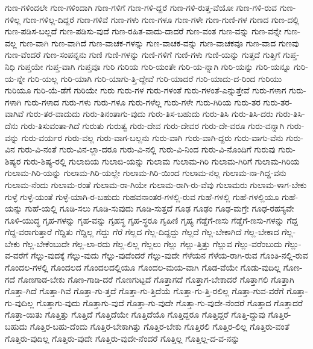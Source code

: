 {ಗುಣ-ಗಳಿಂದಲೇ
ಗುಣ-ಗಳಿಂದಾಗಿ
ಗುಣ-ಗಳಿಗೆ
ಗುಣ-ಗಳಿ-ದ್ದರೆ
ಗುಣ-ಗಳಿ-ರುತ್ತ-ವೆಯೋ
ಗುಣ-ಗಳಿ-ರುವ
ಗುಣ-ಗಳಿಲ್ಲ
ಗುಣ-ಗಳಿಲ್ಲ-ದಿದ್ದರೆ
ಗುಣ-ಗಳಿವೆ
ಗುಣ-ಗಳು
ಗುಣ-ಗಳೂ
ಗುಣ-ಗಳೇ
ಗುಣ-ಗುಣಿ-ಗಳ
ಗುಣದ
ಗುಣ-ದಲ್ಲಿ
ಗುಣ-ಪಡಿಸ-ಬಲ್ಲದೆ
ಗುಣ-ಪಡಿಸು-ವುದೆ
ಗುಣ-ರಹಿತ-ವಾದು-ದಾದರೆ
ಗುಣ-ವಂತ
ಗುಣ-ವನ್ನು
ಗುಣ-ವನ್ನೇ
ಗುಣ-ವಲ್ಲ
ಗುಣ-ವಾಗಿ
ಗುಣ-ವಾಗಿದೆ
ಗುಣ-ವಾಚಕ-ಗಳನ್ನು
ಗುಣ-ವಾಚಕ-ವನ್ನು
ಗುಣ-ವಾಚಕವೂ
ಗುಣ-ವಾದ
ಗುಣವು
ಗುಣ-ವೆಂದರೆ
ಗುಣ-ಸಂಪನ್ನನು
ಗುಣಿ
ಗುಣಿ-ಗಳನ್ನು
ಗುಣಿ-ಗಳಿಗೆ
ಗುಣಿ-ಗಳು
ಗುಣಿ-ಯನ್ನು
ಗುತ್ತದೆ
ಗುತ್ತಿಗೆ
ಗುಪ್ತ-ನಿಧಿ
ಗುಪ್ತಯೇ
ಗುಪ್ತ-ವಾಗಿ
ಗುಪ್ತವೂ
ಗುರಿ
ಗುರಿಯ
ಗುರಿ-ಯಂತೇ
ಗುರಿ-ಯ-ನ್ನಾಗಿ
ಗುರಿ-ಯನ್ನು
ಗುರಿ-ಯನ್ನೂ
ಗುರಿ-ಯ-ನ್ನೇ
ಗುರಿ-ಯಲ್ಲ
ಗುರಿ-ಯಾಗಿ
ಗುರಿ-ಯಾಗು-ತ್ತಿ-ದ್ದೇವೆ
ಗುರಿ-ಯಾದರೆ
ಗುರಿ-ಯಾದು-ದ-ರಿಂದ
ಗುರಿಯು
ಗುರಿಯೂ
ಗುರಿ-ಯೆ-ಡೆಗೆ
ಗುರಿಯೇ
ಗುರು
ಗುರು-ಗಳ
ಗುರು-ಗಳಂತೆ
ಗುರು-ಗಳಂತೆ-ಎನ್ನುತ್ತೇವೆ
ಗುರು-ಗಳಾಗ
ಗುರು-ಗಳಾಗಿ
ಗುರು-ಗಳಾದ
ಗುರು-ಗಳು
ಗುರು-ಗಳೂ
ಗುರು-ಗಳೆಲ್ಲ
ಗುರು-ಗಳೇ
ಗುರು-ಗಿರಿಯ
ಗುರು-ತರ
ಗುರು-ತರ-ವಾಗಿವೆ
ಗುರು-ತರ-ವಾದುದು
ಗುರು-ತಿನಂತಾಗು-ವುದು
ಗುರು-ತಿಸ-ಬಹುದು
ಗುರು-ತಿಸಿ
ಗುರು-ತಿಸಿ-ದರು
ಗುರು-ತಿಸಿ-ದೆನು
ಗುರು-ತಿಸುವಂತಾ-ಗಿದೆ
ಗುರುತು
ಗುರುತ್ವ
ಗುರು-ದೇವ
ಗುರು-ದೇವರ
ಗುರು-ದೇ-ವರೂ
ಗುರು-ವನ್ನಾಗಿ
ಗುರು-ವನ್ನು
ಗುರು-ವರ್ಯರ
ಗುರು-ವಲ್ಲ
ಗುರು-ವಾಗ-ಬಲ್ಲನು
ಗುರು-ವಾಗಿ
ಗುರು-ವಾಗಿ-ದ್ದರು
ಗುರು-ವಾಗು-ವೆನು
ಗುರು-ವಿನ
ಗುರು-ವಿ-ನಂತೆ
ಗುರು-ವಿನ-ಲ್ಲಾ-ದರೂ
ಗುರು-ವಿ-ನಲ್ಲಿ
ಗುರು-ವಿ-ನಿಂದ
ಗುರು-ವಿ-ನೊಂದಿಗೆ
ಗುರುವು
ಗುರು-ಶಿಷ್ಯರ
ಗುರು-ಶಿಷ್ಯ-ರಲ್ಲಿ
ಗುಲಾಬಿಯ
ಗುಲಾಬಿ-ಯನ್ನು
ಗುಲಾಮ
ಗುಲಾಮ-ಗಿರಿ
ಗುಲಾಮ-ಗಿರಿಗೆ
ಗುಲಾಮ-ಗಿರಿಯ
ಗುಲಾಮ-ಗಿರಿ-ಯನ್ನು
ಗುಲಾಮ-ಗಿರಿ-ಯಲ್ಲೇ
ಗುಲಾಮ-ಗಿರಿ-ಯಿಂದ
ಗುಲಾಮ-ನಲ್ಲ
ಗುಲಾಮ-ನಾ-ಗಿದ್ದ-ವನು
ಗುಲಾಮ-ನೆಂದು
ಗುಲಾಮ-ರಂತೆ 
ಗುಲಾಮ-ರಾ-ಗಿಯೇ
ಗುಲಾಮ-ರಾಗಿ-ರು-ವೆವು
ಗುಲಾಮರು
ಗುಲಾಮ-ಳಾಗ-ಬೇಕು
ಗುಳ್ಳೆ
ಗುಳ್ಳೆ-ಯಂತೆ
ಗುಳ್ಳೆ-ಯಾಗಿ-ರ-ಬಹುದು
ಗುಹವನಾಂತರ-ಗಳಲ್ಲಿ-ರುವ
ಗುಹೆ-ಗಳಲ್ಲಿ
ಗುಹೆ-ಗಳಲ್ಲಿಯೂ
ಗುಹೆ-ಯನ್ನು
ಗುಹೆ-ಯಲ್ಲಿ
ಗೂಡಿ-ಸಲು
ಗೂಡಿ-ಸುವುದು
ಗೂಡಿ-ಸುತ್ತದೆ
ಗೂಢ
ಗೂಢಂ
ಗೂಢ-ಮಗ್ರೇ
ಗೂಢ-ರಹಸ್ಯವೇ
ಗೂಳಿ-ಯುದ್ಧ
ಗೃಹ-ಗಳನ್ನು
ಗೃಹ-ವನ್ನು
ಗೃಹಸ್ಥ
ಗೃಹ-ಸ್ಥರೂ
ಗೃಹಿಣಿ
ಗೃಹ್ಯ
ಗೆಡ್ಡೆಗೆ-ಣಸು
ಗೆಡ್ಡೆಗೆ-ಣಸು-ಗಳನ್ನು
ಗೆದ್ದ
ಗೆದ್ದ-ವರಾಗುತ್ತಾರೆ
ಗೆದ್ದಿತು
ಗೆದ್ದಿಲ್ಲ
ಗೆದ್ದು
ಗೆರೆ
ಗೆಲ್ಲದ
ಗೆಲ್ಲ-ದಿದ್ದದ್ದು
ಗೆಲ್ಲದೆ
ಗೆಲ್ಲ-ಬೇಕಾಗಿದೆ
ಗೆಲ್ಲ-ಬೇಕಾದ
ಗೆಲ್ಲ-ಬೇಕು
ಗೆಲ್ಲ-ಬೇಕೆಂಬುದೇ
ಗೆಲ್ಲ-ಲಾ-ರದು
ಗೆಲ್ಲ-ಲಿಲ್ಲ
ಗೆಲ್ಲಲು
ಗೆಲ್ಲು
ಗೆಲ್ಲು-ತ್ತಿತ್ತು
ಗೆಲ್ಲುವ
ಗೆಲ್ಲು-ವರೆಂಬುದು
ಗೆಲ್ಲು-ವ-ವರೆಗೆ
ಗೆಲ್ಲು-ವುದಕ್ಕೆ
ಗೆಲ್ಲು-ವುದು
ಗೆಲ್ಲು-ವುದೆಂದರೆ
ಗೆಲ್ಲು-ವುದೇ
ಗೆಳೆಯನ
ಗೆಳೆಯ-ರಾಗಿ-ರುವ
ಗೊಂತಿ-ನಲ್ಲಿ-ರುವ
ಗೊಂದಲ-ಗಳಲ್ಲಿ
ಗೊಂದಲದ
ಗೊಂದಲದಲ್ಲಿಯೂ
ಗೊಂದಲ-ಮಯ-ವಾಗಿ
ಗೊಡ-ವೆಯೇ
ಗೊಡು-ವುದಿಲ್ಲ
ಗೊಣ-ಗದೆ
ಗೊಣಗಾಡ-ಬೇಕು
ಗೊಣ-ಗಾಡಿ-ದರೆ
ಗೊಣಗುಟ್ಟದೆ
ಗೊತ್ತಾಗದೆ
ಗೊತ್ತಾಗ-ಬೇಕಾದರೆ
ಗೊತ್ತಾಗಲಿ
ಗೊತ್ತಾಗಿ
ಗೊತ್ತಾ-ಗಿದೆ
ಗೊತ್ತಾ-ಗಿವೆ
ಗೊತ್ತಾ-ಗು-ತ್ತದೆ
ಗೊತ್ತಾ-ಗು-ತ್ತಿದೆಯೆ
ಗೊತ್ತಾ-ಗು-ತ್ತಿ-ರಲಿಲ್ಲ
ಗೊತ್ತಾ-ಗುವ-ವರೆಗೆ
ಗೊತ್ತಾ-ಗು-ವುದಿಲ್ಲ
ಗೊತ್ತಾಗು-ವುದು
ಗೊತ್ತಾಗು-ವುದೆ
ಗೊತ್ತಾ-ಗು-ವುದೇ
ಗೊತ್ತಾ-ಗು-ವುದೇ-ನೆಂದರೆ
ಗೊತ್ತಾದ
ಗೊತ್ತಾದರೆ
ಗೊತ್ತಾ-ಯಿತು
ಗೊತ್ತಿತ್ತು
ಗೊತ್ತಿದೆ
ಗೊತ್ತಿದೆಯೇ
ಗೊತ್ತಿದೆಯೊ
ಗೊತ್ತಿದ್ದರೂ
ಗೊತ್ತಿದ್ದರೆ
ಗೊತ್ತಿ-ದ್ದುವು
ಗೊತ್ತಿರ-ಬಹುದು
ಗೊತ್ತಿರ-ಬಹು-ದೆಂದು
ಗೊತ್ತಿರ-ಬೇಕಾಗಿತ್ತು
ಗೊತ್ತಿರ-ಬೇಕು
ಗೊತ್ತಿರಲಿ
ಗೊತ್ತಿರ-ಲಿಲ್ಲ
ಗೊತ್ತಿರು-ವಂತೆ
ಗೊತ್ತಿರು-ವುದಿಲ್ಲ
ಗೊತ್ತಿರು-ವುದೇ
ಗೊತ್ತಿರು-ವುದೇ-ನೆಂದರೆ
ಗೊತ್ತಿಲ್ಲ
ಗೊತ್ತಿಲ್ಲ-ದ-ವ-ನನ್ನು
}
